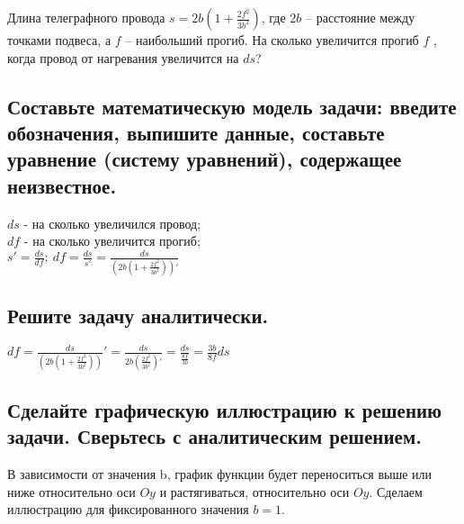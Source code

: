 \documentclass[a4paper,12pt]{article}
\begin{document}
Длина телеграфного провода $s=2b\left(1+\frac{2f^2}{3b^2}\right)$, где $2b$ – расстояние между точками подвеса, а $f$ – наибольший прогиб. На сколько увеличится прогиб $f$ , когда провод от нагревания увеличится на $ds$?

\subsection{Составьте математическую модель задачи: введите обозначения, выпишите данные, составьте уравнение (систему уравнений), содержащее неизвестное.}

$ds$ - на сколько увеличился провод;\\
$df$ - на сколько увеличится прогиб;\\
$s'=\frac{ds}{df};\ df=\frac{ds}{s'}=\frac{ds}{\left(2b
	\left(1+\frac{2f^2}{3b^2}\right)\right)'}$
\subsection{Решите задачу аналитически.}

$df=\frac{ds}{\left(2b\left(1+\frac{2f^2}{3b^2}\right)\right)}'=
\frac{ds}{2b\left(\frac{2f^2}{3b^2}\right)'}=
\frac{ds}{\frac{8f}{3b}}=\frac{3b}{8f}ds$

\subsection{Сделайте графическую иллюстрацию к решению задачи. Сверьтесь с аналитическим решением.}

В зависимости от значения b, график функции будет переноситься выше или ниже относительно оси $Oy$ и растягиваться, относительно оси $Oy$. Сделаем иллюстрацию для фиксированного значения $b=1$.

\end{document}
